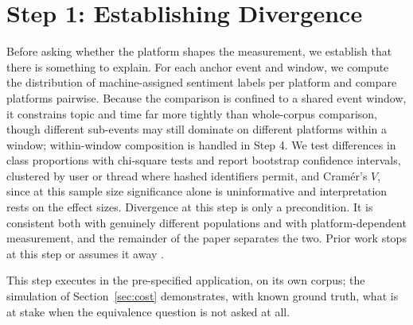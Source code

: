 
\section{Step 1: Establishing Divergence}
\label{sec:divergence}

Before asking whether the platform shapes the measurement, we establish that there is something to explain. For each anchor event and window, we compute the distribution of machine-assigned sentiment labels per platform and compare platforms pairwise. Because the comparison is confined to a shared event window, it constrains topic and time far more tightly than whole-corpus comparison, though different sub-events may still dominate on different platforms within a window; within-window composition is handled in Step 4. We test differences in class proportions with chi-square tests and report bootstrap confidence intervals, clustered by user or thread where hashed identifiers permit, and Cram\'er's $V$, since at this sample size significance alone is uninformative and interpretation rests on the effect sizes. Divergence at this step is only a precondition. It is consistent both with genuinely different populations and with platform-dependent measurement, and the remainder of the paper separates the two. Prior work stops at this step or assumes it away \citep{pellert2022, overgaard2024}.

This step executes in the pre-specified application, on its own corpus; the simulation of Section~\ref{sec:cost} demonstrates, with known ground truth, what is at stake when the equivalence question is not asked at all.

